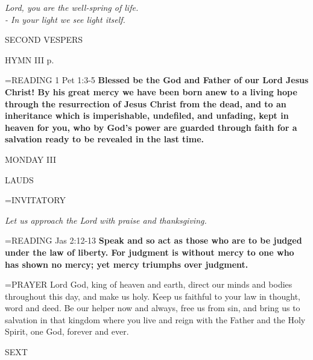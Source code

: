 \begin{center}
\textit{Lord, you are the well-spring of life.\\
- In your light we see light itself.}
\end{center}

\begin{flushleft}\normalsize SECOND VESPERS\\\end{flushleft}

HYMN III p. \pageref{ordinaryTime:thirdHymn}

\hangindent=\parindent \small{READING} 1 Pet 1:3-5 \textbf{Blessed be the God and Father of our Lord Jesus Christ! By his great mercy we have been born anew to a living hope through the resurrection of Jesus Christ from the dead, and to an inheritance which is imperishable, undefiled, and unfading, kept in heaven for you, who by God’s power are guarded through faith for a salvation ready to be revealed in the last time.\\}

\begin{center}
\normalsize MONDAY III
\end{center}

\begin{flushleft}\normalsize LAUDS\\\end{flushleft}

\hangindent=\parindent \small{INVITATORY}
\begin{center}
\textit{Let us approach the Lord with praise and thanksgiving.\\}
\end{center}

\hangindent=\parindent \small{READING} Jas 2:12-13 \textbf{Speak and so act as those who are to be judged under the law of liberty. For judgment is without mercy to one who has shown no mercy; yet mercy triumphs over judgment.\\}

\hangindent=\parindent \small{PRAYER  Lord God, king of heaven and earth, direct our minds and bodies throughout this day, and make us holy. Keep us faithful to your law in thought, word and deed. Be our helper now and always, free us from sin, and bring us to salvation in that kingdom where you live and reign with the Father and the Holy Spirit, one God, forever and ever.}

\begin{flushleft}\normalsize SEXT\\\end{flushleft}

